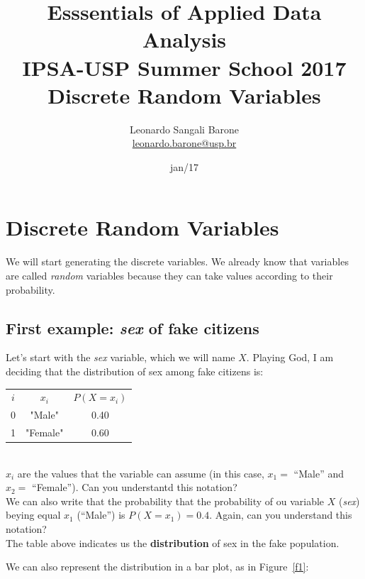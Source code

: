\documentclass[11pt]{article}
\title{\textbf{Esssentials of Applied Data Analysis\\
				IPSA-USP Summer School 2017}\newline\\
				Discrete Random Variables}
\author{Leonardo Sangali Barone\\ \href{leonardo.barone@usp.br}{leonardo.barone@usp.br}}
\date{jan/17}
\begin{document}
\maketitle

\section*{Discrete Random Variables}

	We will start generating the discrete variables. We already know that variables are called \emph{random} variables because they can take values according to their probability.\\
	
	\subsection*{First example: \emph{sex} of fake citizens}
	
	Let's start with the \emph{sex} variable, which we will name $X$. Playing God, I am deciding that the distribution of sex among fake citizens is:\\
	
\begin{tabular}{|c|c|c|}
\hline
	$i$ & $x_i$ & $P(X=x_i)$\\
	\cline{1-3}
	0 & "Male" & 0.40\\
	1 & "Female" & 0.60\\
\hline
\end{tabular}\\

$x_i$ are the values that the variable can assume (in this case, $x_1 = $ ``Male'' and $x_2 = $ ``Female''). Can you understantd this notation?\\

We can also write that the probability that the probability of ou variable $X$ (\emph{sex}) beying equal $x_1$ (``Male'') is $P(X = x_1) = 0.4$. Again, can you understand this notation?\\

The table above indicates us the \textbf{distribution} of sex in the fake population.

We can also represent the distribution in a bar plot, as in Figure~\ref{f1}:
\end{document}
